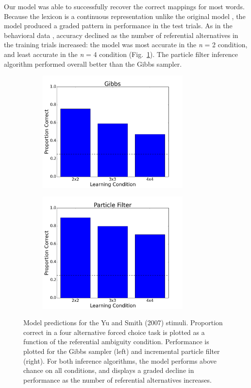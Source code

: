 \documentclass[man,noapacite,12pt]{apa2}
\begin{document}
Our model was able to successfully recover the correct mappings for most words. Because the lexicon is a continuous representation unlike the original model \cite{frank2009}, the model produced a graded pattern in performance in the test trials. As in the behavioral data  \cite{yu2007b}, accuracy declined as the number of referential alternatives in the training trials increased: the model was most accurate in the {\it n} = 2 condition, and least accurate in the  {\it n}  = 4 condition (Fig.~\ref{fig:yu2007sim}). The particle filter inference algorithm performed overall better than the Gibbs sampler. 

\begin{figure}[h!]
\centering
\begin{subfigure}{.5\textwidth}
  \centering
  \includegraphics[width=3in]{figures/Gibbs.png}
\end{subfigure}%
\begin{subfigure}{.5\textwidth}
  \centering
  \includegraphics[width=3in]{figures/ParticleFilter.png}
\end{subfigure}
\caption{Model predictions for the Yu and Smith (2007) stimuli. Proportion correct in a four alternative forced choice task is plotted as a function of the referential ambiguity condition. Performance is plotted for the Gibbs sampler (left) and incremental particle filter (right). For both inference algorithms, the model performs above chance on all conditions, and displays a graded decline in performance as the number of referential alternatives increases.}
\label{fig:yu2007sim}
\end{figure}
\end{document}
